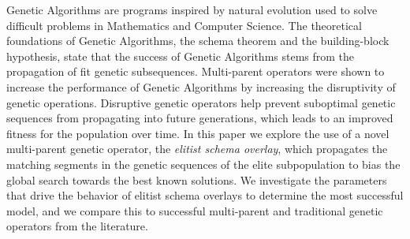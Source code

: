 Genetic Algorithms are programs inspired by natural evolution used to solve difficult problems in Mathematics and Computer Science. The theoretical foundations of Genetic Algorithms, the schema theorem and the building-block hypothesis, state that the success of Genetic Algorithms stems from the propagation of fit genetic subsequences. Multi-parent operators were shown to increase the performance of Genetic Algorithms by increasing the disruptivity of genetic operations. Disruptive genetic operators help prevent suboptimal genetic sequences from propagating into future generations, which leads to an improved fitness for the population over time. In this paper we explore the use of a novel multi-parent genetic operator, the \emph{elitist schema overlay}, which propagates the matching segments in the genetic sequences of the elite subpopulation to bias the global search towards the best known solutions. We investigate the parameters that drive the behavior of elitist schema overlays to determine the most successful model, and we compare this to successful multi-parent and traditional genetic operators from the literature. 